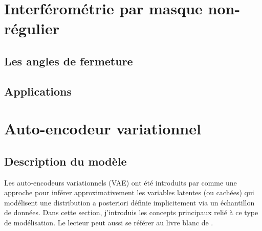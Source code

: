 \section{Interférométrie par masque non-régulier}


\subsection{Les angles de fermeture}

\subsection{Applications}


\section{Auto-encodeur variationnel}

\subsection{Description du modèle}

Les auto-encodeurs variationnels (VAE) ont été introduits par \citet{Kingma2013} comme une approche 
pour inférer approximativement les variables latentes (ou cachées) qui modélisent une distribution 
a posteriori définie implicitement via un échantillon de données. Dans cette section, j'introduis 
les concepts principaux relié à ce type de modélisation. 
Le lecteur peut aussi se référer au livre blanc de \citet{Kingma2019}.

